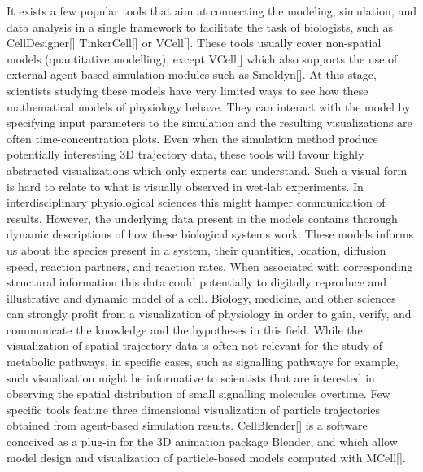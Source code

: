 It exists a few popular tools that aim at connecting the modeling, simulation, and data analysis in a single framework to facilitate the task of biologists, such as CellDesigner[] TinkerCell[] or VCell[].
These tools usually cover non-spatial models (quantitative modelling), except VCell[] which also supports the use of external agent-based simulation modules such as Smoldyn[].
At this stage, scientists studying these models have very limited ways to see how these mathematical models of physiology behave.
They can interact with the model by specifying input parameters to the simulation and the resulting visualizations are often time-concentration plots.
Even when the simulation method produce potentially interesting 3D trajectory data, these tools will favour highly abstracted visualizations which only experts can understand.
Such a visual form is hard to relate to what is visually observed in wet-lab experiments. 
In interdisciplinary physiological sciences this might hamper communication of results. 
However, the underlying data present in the models contains thorough dynamic descriptions of how these biological systems work.
These models informs us about the species present in a system, their quantities, location, diffusion speed, reaction partners, and reaction rates.
When associated with corresponding structural information this data could potentially to digitally reproduce and illustrative and dynamic model of a cell.
Biology, medicine, and other sciences can strongly profit from a visualization of physiology in order to gain, verify, and communicate the knowledge and the hypotheses in this field.
While the visualization of spatial trajectory data is often not relevant for the study of metabolic pathways, in specific cases, such as signalling pathways for example, such visualization might be informative to scientists that are interested in observing the spatial distribution of small signalling molecules overtime.
Few specific tools feature three dimensional visualization of particle trajectories obtained from agent-based simulation results.
CellBlender[] is a software conceived as a plug-in for the 3D animation package Blender, and which allow model design and visualization of particle-based models computed with MCell[].

